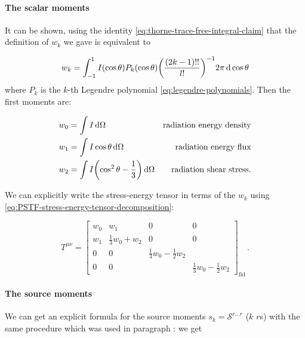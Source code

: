 \documentclass[main.tex]{subfiles}
\begin{document}
\paragraph{The scalar moments} \label{par:scalar-moments}

It can be shown, using the identity \eqref{eq:thorne-trace-free-integral-claim}  that the definition of \(w_k\) we gave is equivalent to

\begin{equation}
    w_k = \int_{-1}^1 I(\cos \theta) P_k(\cos \theta) \qty(\frac{(2k-1)!!}{l!})^{-1} 2 \pi\dd{\cos \theta}
\end{equation}
where \(P_k\) is the \(k\)-th Legendre polynomial \eqref{eq:legendre-polynomials}.
Then the first moments are:

\begin{subequations}
\begin{align}
  w_0 &= \int I \dd{\Omega} & \text{radiation energy density} \\
  w_1 &= \int I \cos \theta \dd{\Omega} & \text{radiation energy flux} \\
  w_2 &= \int I \qty(\cos^2 \theta - \frac{1}{3}) \dd{\Omega} & \text{radiation shear stress.}
\end{align}
\end{subequations}

We can explicitly write the stress-energy tensor in terms of the \(w_k\) using \eqref{eq:PSTF-stress-energy-tensor-decomposition}:

\begin{equation} \label{eq:radiation-stress-energy-tensor-fiducial}
    T^{\mu\nu} = \begin{bmatrix}
    w_0   & w_1  & 0  & 0 \\
    w_1   & \frac{1}{3}w_0 + w_2  &  0  & 0 \\
      0 & 0  &  \frac{1}{3}w_0 -\frac{1}{2}w_2 &  \\
      0 & 0  &   & \frac{1}{3}w_0 -\frac{1}{2}w_2
  \end{bmatrix} _{\text{fid}}\,.
\end{equation}

\paragraph{The source moments}

We can get an explicit formula for the source moments \(s_k = \mathscr S ^{r\dots r}\) (\(k\) \(r\)s) with the same procedure which was used in paragraph :
we get
\end{document}

